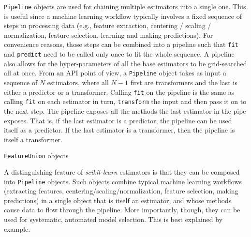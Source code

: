 \documentclass{llncs}
\begin{document}
\texttt{Pipeline} objects are used for chaining multiple estimators into a
single one. This is useful since a machine learning workflow typically involves
a fixed sequence of steps in processing data (e.g., feature extraction,
centering / scaling / normalization, feature selection, learning and making
predictions). For convenience reasons, those steps can be combined into a
pipeline such that \texttt{fit} and \texttt{predict} need to be called only once
to fit the whole sequence. A pipeline also allows for the hyper-parameters of
all the base estimators to be grid-searched all at once. From an API point of
view, a \texttt{Pipeline} object takes as input a sequence of $N$ estimators,
where all $N-1$ first are transformers and the last is either a predictor or a
transformer. Calling \texttt{fit} on the pipeline is the same as calling
\texttt{fit} on each estimator in turn, \texttt{transform} the input and then
pass it on to the next step. The pipeline exposes all the methods the last
estimator in the pipe exposes. That is, if the last estimator is a predictor,
the pipeline can be used itself as a predictor. If the last estimator is a
transformer, then the pipeline is itself a transformer.

\texttt{FeatureUnion} objects


\vspace{3cm}




A distinguishing feature of \textit{scikit-learn} estimators
is that they can be composed into \texttt{Pipeline} objects.
Such objects combine typical machine learning workflows
(extracting features, centering/scaling/normalization,
feature selection, making predictions)
in a single object that is itself an estimator,
and whose methods cause data to flow through the pipeline.
More importantly, though, they can be used for
systematic, automated model selection.
This is best explained by example.
\end{document}

